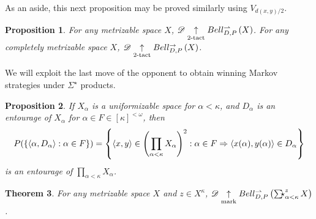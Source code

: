 \documentclass{amsart}
\newtheorem{theorem}{Theorem}[section]
\newtheorem{proposition}[theorem]{Proposition}
\theoremstyle{definition}
\begin{document}
  As an aside, this next proposition may be proved similarly
  using \(V_{d(x,y)/2}\).

  \begin{proposition}
    For any metrizable space \(X\),
    \(\mathscr{D}\underset{2\text{-tact}}{\uparrow}Bell_{D,P}^{\rightharpoonup}\left({X}\right)\).
    For any completely metrizable space \(X\),
    \(\mathscr{D}\underset{2\text{-tact}}{\uparrow}Bell_{D,P}^{\to}\left({X}\right)\).
  \end{proposition}

  We will exploit the last move of the
  opponent to obtain winning Markov strategies under
  \(\Sigma^\star\) products.

  \begin{proposition}
    If \(X_\alpha\) is a uniformizable space for \(\alpha<\kappa\),
    and \(D_\alpha\) is an entourage of \(X_\alpha\) for
    \(\alpha\in F\in[\kappa]^{<\omega}\), then
      \[
        P(\{\langle\alpha,D_\alpha\rangle:\alpha\in F\})
          =
        \left\{
          \langle x,y\rangle\in\left(\prod_{\alpha<\kappa}X_\alpha\right)^2
        :
          \alpha\in F
        \Rightarrow
          \langle x(\alpha),y(\alpha)\rangle\in D_\alpha
        \right\}
      \]
    is an entourage of \(\prod_{\alpha<\kappa}X_\alpha\).
  \end{proposition}

  \begin{theorem}
    For any metrizable space \(X\) and \(z\in X^\kappa\),
    \(\pl D\markwin\bellConGame{\SigmaStarProd_{\alpha<\kappa}^z X}\).
  \end{theorem}
\end{document}

